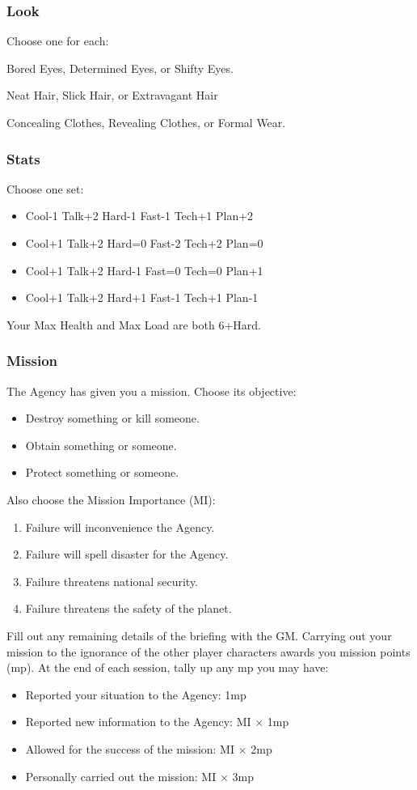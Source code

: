\subsubsection{Look}
Choose one for each:

Bored Eyes, Determined Eyes, or Shifty Eyes.

Neat Hair, Slick Hair, or Extravagant Hair

Concealing Clothes, Revealing Clothes, or Formal Wear.

\subsubsection{Stats}
Choose one set:
\begin{itemize}
\setlength\itemsep{0em}
\item Cool-1 Talk+2 Hard-1 Fast-1 Tech+1 Plan+2
\item Cool+1 Talk+2 Hard=0 Fast-2 Tech+2 Plan=0
\item Cool+1 Talk+2 Hard-1 Fast=0 Tech=0 Plan+1
\item Cool+1 Talk+2 Hard+1 Fast-1 Tech+1 Plan-1
\end{itemize}

Your Max Health and Max Load are both 6+Hard.

\subsubsection{Mission}
The Agency has given you a mission. Choose its objective:
\begin{itemize}
\item Destroy something or kill someone.
\item Obtain something or someone.
\item Protect something or someone.
\end{itemize}

Also choose the Mission Importance (MI):
\begin{enumerate}
\item Failure will inconvenience the Agency.
\item Failure will spell disaster for the Agency.
\item Failure threatens national security.
\item Failure threatens the safety of the planet.
\end{enumerate}

Fill out any remaining details of the briefing with the GM. Carrying out your mission to the ignorance of the other player characters awards you mission points (mp). At the end of each session, tally up any mp you may have:
\begin{itemize}
\item Reported your situation to the Agency: 1mp
\item Reported new information to the Agency: MI $\times$ 1mp
\item Allowed for the success of the mission: MI $\times$ 2mp
\item Personally carried out the mission: MI $\times$ 3mp
\end{itemize}


